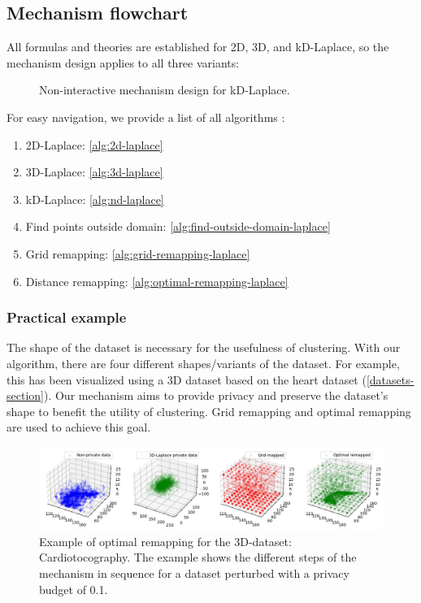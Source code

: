 \subsection{Mechanism flowchart}
All formulas and theories are established for 2D, 3D, and kD-Laplace, so the mechanism design applies to all three variants:
\begin{figure}[H]
    
    \caption{Non-interactive mechanism design for kD-Laplace.}
    \label{fig:final-mechanism-design}
\end{figure}
For easy navigation, we provide a list of all algorithms :
\begin{enumerate}
    \item 2D-Laplace:  \ref{alg:2d-laplace}
    \item 3D-Laplace: \ref{alg:3d-laplace}
    \item kD-Laplace: \ref{alg:nd-laplace}
    \item Find points outside domain: \ref{alg:find-outside-domain-laplace}
    \item Grid remapping: \ref{alg:grid-remapping-laplace}
    \item Distance remapping: \ref{alg:optimal-remapping-laplace}
\end{enumerate}
\subsubsection{Practical example}
The shape of the dataset is necessary for the usefulness of clustering.
With our algorithm, there are four different shapes/variants of the dataset.
For example, this has been visualized using a 3D dataset based on the heart dataset (\ref{datasets-section}).
Our mechanism aims to provide privacy and preserve the dataset's shape to benefit the utility of clustering.
Grid remapping and optimal remapping are used to achieve this goal.

\begin{figure}[H]
    \includegraphics[width=1.1\textwidth]{TheorethicalFramework/ND-Laplace/Images/optimal-remapping-example.png}
    \caption{Example of optimal remapping for the 3D-dataset: Cardiotocography. The example shows the different steps of the mechanism in sequence for a dataset perturbed with a privacy budget of 0.1.}
\end{figure}

